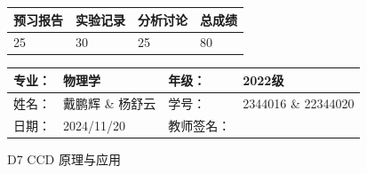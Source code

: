 \documentclass[dvipsnames, svgnames,a4paper,11pt]{article}
\begin{document}
\begin{table}
	\renewcommand\arraystretch{1.7}
	\begin{tabularx}{\textwidth}{
		|X|X|X|X
		|X|X|X|X|}
	\hline
	\multicolumn{2}{|c|}{预习报告}&\multicolumn{2}{|c|}{实验记录}&\multicolumn{2}{|c|}{分析讨论}&\multicolumn{2}{|c|}{总成绩}\\
	\hline
	\LARGE25 & & \LARGE30 & & \LARGE25 & & \LARGE80 & \\
	\hline
	\end{tabularx}
\end{table}


\begin{table}
	\renewcommand\arraystretch{1.7}
	\begin{tabularx}{\textwidth}{|X|X|X|X|}
	\hline
	专业：& 物理学 &年级：& 2022级\\
	\hline
	姓名：& 戴鹏辉 \& 杨舒云  & 学号： & 2344016 \& 22344020 \\
	\hline
	日期：& 2024/11/20 & 教师签名：& \\
	\hline
	\end{tabularx}
\end{table}

\begin{center}
	\LARGE D7 \quad CCD 原理与应用
\end{center}
\end{document}
